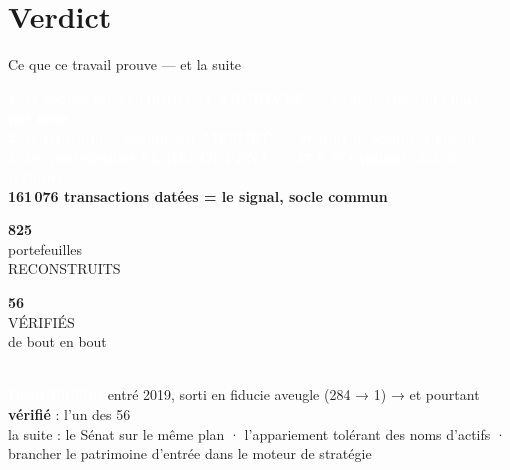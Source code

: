 \documentclass[11pt,aspectratio=169]{beamer}
\newcommand{\tuile}[3]{%
  \begin{minipage}[t]{0.23\textwidth}\centering
    \colorbox{#1}{\parbox[c][21mm][c]{\dimexpr\linewidth-8pt}{\centering
      {\color{white}\Large\textbf{#2}}\\[0.6mm]
      {\color{white}\footnotesize #3}}}
  \end{minipage}}
\newcommand{\badge}[2]{\colorbox{#1}{\textcolor{white}{\footnotesize\textbf{#2}}}}
\newcommand{\badgel}[2]{\colorbox{#1}{\textcolor{black!80}{\footnotesize\textbf{#2}}}}
\newcommand{\colB}{}
\begin{document}
\section{Verdict}
\begin{frame}{Ce que ce travail prouve — et la suite}
  \colB
  \centering
  {\footnotesize
  \badge{helec}{1. la source est exhaustive et ARCHIVÉE — c'est le site qui efface, pas nous}\\[2mm]
  \badge{helec}{2. le tri lisible / scanné est MESURÉ — et tout le scanné a été lu}\\[2mm]
  \badge{helec}{3. les portefeuilles SE RECOUPENT — 87,8 \% expliqué, 3,3 \% résiduel}}\\[3mm]
  {\footnotesize \badgel{dataC!20}{\textcolor{dataC}{\textbf{161\,076} transactions datées = le signal, socle commun}}}\\[2.5mm]
  \hfill\tuile{helec}{825}{portefeuilles\\RECONSTRUITS}\hfill\tuile{okgreen}{56}{VÉRIFIÉS\\de bout en bout}\hfill\\[2.5mm]
  {\footnotesize \badge{okgreen}{Dean Phillips} entré 2019, sorti en fiducie aveugle (284 → 1) → et pourtant \textbf{vérifié} : l'un des 56}\\[1.5mm]
  {\scriptsize\color{black!60} la suite : le Sénat sur le même plan · l'appariement tolérant des noms d'actifs · brancher le patrimoine d'entrée dans le moteur de stratégie}
\end{frame}
\end{document}
